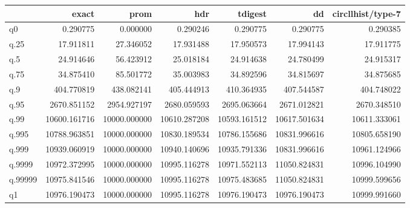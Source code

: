 \begin{tabular}{lrrrrrr}
\toprule
{} &         exact &          prom &           hdr &       tdigest &            dd &  circllhist/type-7 \\
\midrule
q0      &      0.290775 &      0.000000 &      0.290246 &      0.290775 &      0.290775 &           0.290385 \\
q.25    &     17.911811 &     27.346052 &     17.931488 &     17.950573 &     17.994143 &          17.911775 \\
q.5     &     24.914646 &     56.423912 &     25.018184 &     24.914638 &     24.780499 &          24.915317 \\
q.75    &     34.875410 &     85.501772 &     35.003983 &     34.892596 &     34.815697 &          34.875685 \\
q.9     &    404.770819 &    438.082141 &    405.444913 &    410.364935 &    407.544587 &         404.748022 \\
q.95    &   2670.851152 &   2954.927197 &   2680.059593 &   2695.063664 &   2671.012821 &        2670.348510 \\
q.99    &  10600.161716 &  10000.000000 &  10610.287208 &  10593.161512 &  10617.501634 &       10611.333061 \\
q.995   &  10788.963851 &  10000.000000 &  10830.189534 &  10786.155686 &  10831.996616 &       10805.658190 \\
q.999   &  10939.060919 &  10000.000000 &  10940.140696 &  10935.791336 &  10831.996616 &       10961.124966 \\
q.9999  &  10972.372995 &  10000.000000 &  10995.116278 &  10971.552113 &  11050.824831 &       10996.104990 \\
q.99999 &  10975.841546 &  10000.000000 &  10995.116278 &  10975.483685 &  11050.824831 &       10999.599656 \\
q1      &  10976.190473 &  10000.000000 &  10995.116278 &  10976.190473 &  10976.190473 &       10999.991660 \\
\bottomrule
\end{tabular}
